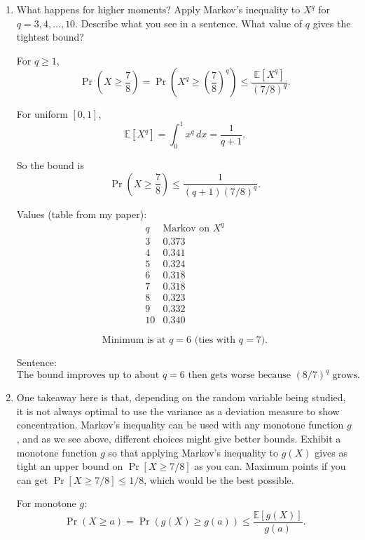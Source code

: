 \documentclass[10pt]{article}
\newcommand{\spara}[1]{\vspace{.5em}\noindent {\large\sffamily\textcolor{nyuOfficialPurple}{#1}}}
\newcommand{\E}{\mathbb{E}}
\begin{document}
\begin{enumerate}[label=\arabic*.]
Therefore
\[
\Pr\!\left(X\ge \frac{7}{8}\right)
=
\Pr\!\left(X^2\ge \frac{49}{64}\right)
\le
\frac{1/3}{49/64}
=
\frac{64}{147}
\approx 0.435.
\]

\[
\boxed{\Pr[X\ge 7/8]\le \frac{64}{147}.}
\]


	\item What happens for higher moments? Apply Markov's inequality to $X^q$ for $q = 3,4,\ldots,10$. Describe what you see in a sentence. What value of $q$ gives the tightest bound?

\spara{Pr. 1.4}

For $q\ge 1$,
\[
\Pr\!\left(X\ge \frac{7}{8}\right)
=
\Pr\!\left(X^q \ge \left(\frac{7}{8}\right)^q\right)
\le
\frac{\E[X^q]}{(7/8)^q}.
\]

For uniform $[0,1]$,
\[
\E[X^q]=\int_0^1 x^q\,dx=\frac{1}{q+1}.
\]

So the bound is
\[
\Pr\!\left(X\ge \frac{7}{8}\right)\le
\frac{1}{(q+1)(7/8)^q}.
\]

Values (table from my paper):
\[
\begin{array}{c|c}
q & \text{Markov on }X^q \\
\hline
3 & 0.373\\
4 & 0.341\\
5 & 0.324\\
6 & 0.318\\
7 & 0.318\\
8 & 0.323\\
9 & 0.332\\
10 & 0.340
\end{array}
\]

\[
\boxed{\text{Minimum is at } q=6 \text{ (ties with } q=7\text{).}}
\]

Sentence:
\[
\text{The bound improves up to about }q=6\text{ then gets worse because }(8/7)^q\text{ grows.}
\]


	\item One takeaway here is that, depending on the random variable being studied, it is not always optimal to use the variance as a deviation measure to show concentration. Markov's inequality can be used with any monotone function $g$, and as we see above, different choices might give better bounds. Exhibit a monotone function $g$ so that applying Markov's inequality to $g(X)$ gives as tight an upper bound on $\Pr[X \geq 7/8]$ as you can. Maximum points if you can get $\Pr[X \geq 7/8] \leq 1/8$, which would be the best possible.

\spara{Pr. 1.5}

For monotone $g$:
\[
\Pr(X\ge a)=\Pr(g(X)\ge g(a))\le \frac{\E[g(X)]}{g(a)}.
\]


\end{enumerate}
\end{document}
